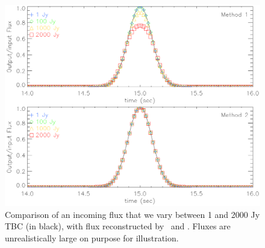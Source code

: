 \begin{figure}
  \includegraphics[clip, angle=0, width=\columnwidth]{Figures/planet_profiles_2.eps}
  \caption{Comparison of an incoming flux that we vary between 1 and 2000 Jy TBC (in black), with flux reconstructed by \methodu\ and \methodd. Fluxes are unrealistically large on purpose for illustration. }
  \label{fig:planet_profiles}
\end{figure}


